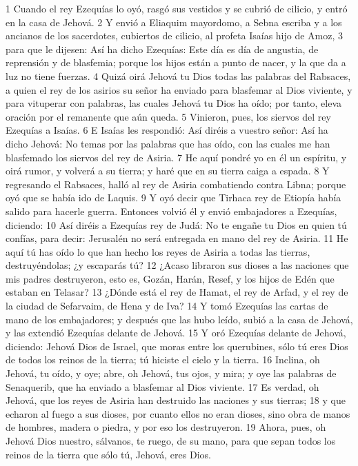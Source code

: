 1 Cuando el rey Ezequías lo oyó, rasgó sus vestidos y se cubrió de cilicio, y entró en la casa de Jehová.
2 Y envió a Eliaquim mayordomo, a Sebna escriba y a los ancianos de los sacerdotes, cubiertos de cilicio, al profeta Isaías hijo de Amoz,
3 para que le dijesen: Así ha dicho Ezequías: Este día es día de angustia, de reprensión y de blasfemia; porque los hijos están a punto de nacer, y la que da a luz no tiene fuerzas.
4 Quizá oirá Jehová tu Dios todas las palabras del Rabsaces, a quien el rey de los asirios su señor ha enviado para blasfemar al Dios viviente, y para vituperar con palabras, las cuales Jehová tu Dios ha oído; por tanto, eleva oración por el remanente que aún queda.
5 Vinieron, pues, los siervos del rey Ezequías a Isaías.
6 E Isaías les respondió: Así diréis a vuestro señor: Así ha dicho Jehová: No temas por las palabras que has oído, con las cuales me han blasfemado los siervos del rey de Asiria.
7 He aquí pondré yo en él un espíritu, y oirá rumor, y volverá a su tierra; y haré que en su tierra caiga a espada.
8 Y regresando el Rabsaces, halló al rey de Asiria combatiendo contra Libna; porque oyó que se había ido de Laquis.
9 Y oyó decir que Tirhaca rey de Etiopía había salido para hacerle guerra. Entonces volvió él y envió embajadores a Ezequías, diciendo:
10 Así diréis a Ezequías rey de Judá: No te engañe tu Dios en quien tú confías, para decir: Jerusalén no será entregada en mano del rey de Asiria.
11 He aquí tú has oído lo que han hecho los reyes de Asiria a todas las tierras, destruyéndolas; ¿y escaparás tú?
12 ¿Acaso libraron sus dioses a las naciones que mis padres destruyeron, esto es, Gozán, Harán, Resef, y los hijos de Edén que estaban en Telasar?
13 ¿Dónde está el rey de Hamat, el rey de Arfad, y el rey de la ciudad de Sefarvaim, de Hena y de Iva?
14 Y tomó Ezequías las cartas de mano de los embajadores; y después que las hubo leído, subió a la casa de Jehová, y las extendió Ezequías delante de Jehová.
15 Y oró Ezequías delante de Jehová, diciendo: Jehová Dios de Israel, que moras entre los querubines, sólo tú eres Dios de todos los reinos de la tierra; tú hiciste el cielo y la tierra.
16 Inclina, oh Jehová, tu oído, y oye; abre, oh Jehová, tus ojos, y mira; y oye las palabras de Senaquerib, que ha enviado a blasfemar al Dios viviente.
17 Es verdad, oh Jehová, que los reyes de Asiria han destruido las naciones y sus tierras;
18 y que echaron al fuego a sus dioses, por cuanto ellos no eran dioses, sino obra de manos de hombres, madera o piedra, y por eso los destruyeron.
19 Ahora, pues, oh Jehová Dios nuestro, sálvanos, te ruego, de su mano, para que sepan todos los reinos de la tierra que sólo tú, Jehová, eres Dios.
